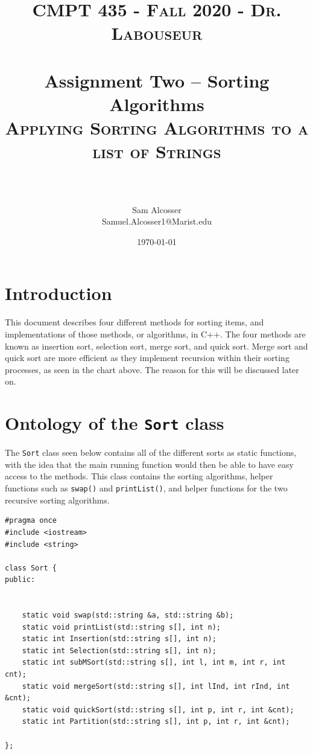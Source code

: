 \documentclass[letterpaper, 10pt]{article}
\title{	
   \normalfont \normalsize 
   \textsc{CMPT 435 - Fall 2020 - Dr. Labouseur} \\[10pt] %
   \horrule{0.5pt} \\[0.25cm] 	%
   \large{Assignment Two -- Sorting Algorithms} \\
   \textsc{Applying Sorting Algorithms to a list of Strings}\\[20pt]%

   \horrule{0.5pt} \\ 	%
   


   \author{Sam Alcosser \\ \normalsize Samuel.Alcosser1@Marist.edu}
\date{\normalsize\today} 
}
\begin{document}
\selectfont
\maketitle
\tableofcontents
\newpage

\section{Introduction}

This document describes four different methods for sorting items, and implementations of those methods, or algorithms, in C++. The four methods are known as insertion sort, selection sort,  merge sort, and quick sort. Merge sort and quick sort are more efficient as they implement recursion within their sorting processes, as seen in the chart above. The reason for this will be discussed later on.

\section{Ontology of the \texttt{Sort} class}

The \texttt{Sort} class seen below contains all of the different sorts as static functions, with the idea that the main running function would then be able to have easy access to the methods. This class contains the sorting algorithms, helper functions such as \texttt{swap()} and \texttt{printList()}, and helper functions for the two recursive sorting algorithms.




\begin{addmargin}[-5em]{1em}
\begin{small}
\begin{verbatim}
#pragma once
#include <iostream>
#include <string>

class Sort {
public:


	static void swap(std::string &a, std::string &b);
	static void printList(std::string s[], int n);
	static int Insertion(std::string s[], int n);
	static int Selection(std::string s[], int n);
	static int subMSort(std::string s[], int l, int m, int r, int cnt);
	static void mergeSort(std::string s[], int lInd, int rInd, int &cnt);
	static void quickSort(std::string s[], int p, int r, int &cnt);
	static int Partition(std::string s[], int p, int r, int &cnt);

};

\end{verbatim}
\end{small}
\end{addmargin}
\end{document}
